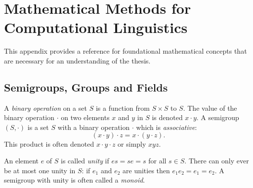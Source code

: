  

%


% 
 

 \chapter{Mathematical Methods for Computational Linguistics}

This appendix provides a reference for foundational mathematical concepts that are necessary for an understanding of the thesis.

\section{Semigroups, Groups and Fields}
\label{semigroups}

\begin{defn}[Semigroup]
A \emph{binary operation} on a set $S$ is a function from $S\times S$ to $S$. The value of the binary operation $\cdot$ on two elements $x$ and $y$ in $S$ is denoted $x \cdot y$. A semigroup $(S,\cdot)$ is a set $S$ with a binary operation $\cdot$ which is \emph{associative}:
$$(x\cdot y)\cdot z = x \cdot (y \cdot z).$$
This product is often denoted $x\cdot y \cdot z$ or simply $xyz$.

An element $e$ of $S$ is called \emph{unity} if $es = se = s$ for all $s \in S$. There can only ever be at most one unity in $S$: if $e_1$ and $e_2$ are unities then $e_1e_2 = e_1 = e_2$. A semigroup with unity is often called a \emph{monoid}.
\end{defn}
 
